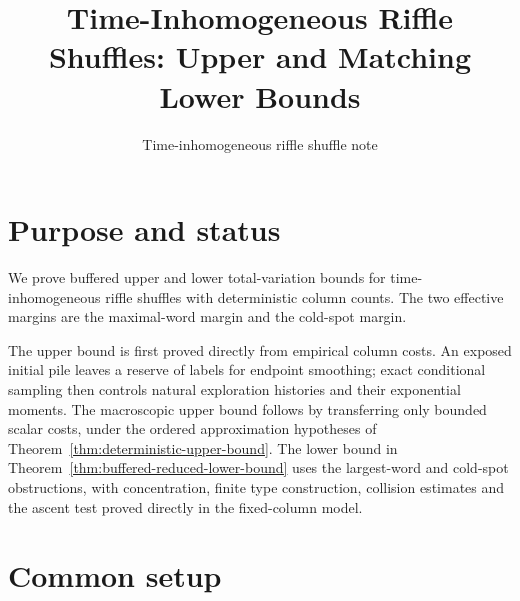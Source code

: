 \documentclass[11pt]{article}
\title{Time-Inhomogeneous Riffle Shuffles: Upper and Matching Lower Bounds}
\author{Time-inhomogeneous riffle shuffle note}
\date{}
\numberwithin{equation}{section}
\newcommand{\1}{\mathbf 1}
\begin{document}
\maketitle

\section{Purpose and status}

We prove buffered upper and lower total-variation bounds for time-inhomogeneous riffle shuffles with deterministic column counts. The two effective margins are the maximal-word margin and the cold-spot margin.

The upper bound is first proved directly from empirical column costs. An exposed initial pile leaves a reserve of labels for endpoint smoothing; exact conditional sampling then controls natural exploration histories and their exponential moments. The macroscopic upper bound follows by transferring only bounded scalar costs, under the ordered approximation hypotheses of Theorem~\ref{thm:deterministic-upper-bound}. The lower bound in Theorem~\ref{thm:buffered-reduced-lower-bound} uses the largest-word and cold-spot obstructions, with concentration, finite type construction, collision estimates and the ascent test proved directly in the fixed-column model.

\section{Common setup}
\label{sec:common-setup}
\end{document}
